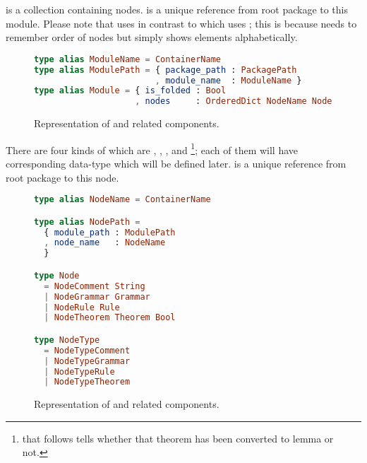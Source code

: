\documentclass[master.tex]{subfiles}
\begin{document}
 is a collection containing nodes.  is a
unique reference from root package to this module. Please note that
 uses  in contrast to  which
uses ; this is because  needs to remember order
of nodes but  simply shows elements alphabetically.

\begin{figure}[H]
\begin{framed}
\begin{lstlisting}[language=elm]
type alias ModuleName = ContainerName
type alias ModulePath = { package_path : PackagePath
                        , module_name  : ModuleName }
type alias Module = { is_folded : Bool
                    , nodes     : OrderedDict NodeName Node }
\end{lstlisting}
\end{framed}
\caption{Representation of  and related components.}
\label{fig:implementation-repo-module}
\end{figure}

There are four kinds of  which are , ,
, and \footnote{ that follows
   tells whether that theorem has been converted to lemma or
  not.}; each of them will have corresponding data-type which will be defined
later.  is a unique reference from root package to this node.

\begin{figure}[H]
\begin{framed}
\begin{lstlisting}[language=elm]
type alias NodeName = ContainerName

type alias NodePath =
  { module_path : ModulePath
  , node_name   : NodeName
  }

type Node
  = NodeComment String
  | NodeGrammar Grammar
  | NodeRule Rule
  | NodeTheorem Theorem Bool

type NodeType
  = NodeTypeComment
  | NodeTypeGrammar
  | NodeTypeRule
  | NodeTypeTheorem
\end{lstlisting}
\end{framed}
\caption{Representation of  and related components.}
\label{fig:implementation-repo-node}
\end{figure}
\end{document}
